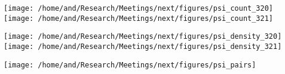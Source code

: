 \documentclass{article}
\begin{document}
\centering
\texttt{[image: /home/and/Research/Meetings/next/figures/psi\_count\_320]}
\texttt{[image: /home/and/Research/Meetings/next/figures/psi\_count\_321]}

\texttt{[image: /home/and/Research/Meetings/next/figures/psi\_density\_320]}
\texttt{[image: /home/and/Research/Meetings/next/figures/psi\_density\_321]}

\texttt{[image: /home/and/Research/Meetings/next/figures/psi\_pairs]}
\end{document}
